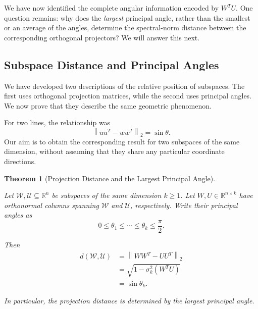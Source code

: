 \documentclass[14pt,letterpaper]{article}
\theoremstyle{plain}
\newtheorem{theorem}{Theorem}[section]
\theoremstyle{definition}
\theoremstyle{remark}
\newcommand{\R}{\mathbb{R}}
\newcommand{\norm}[1]{\left\lVert #1 \right\rVert}
\begin{document}
We have now identified the complete angular
information encoded by $W^TU$. One question remains:
why does the \emph{largest} principal angle, rather than
the smallest or an average of the angles, determine the
spectral-norm distance between the corresponding
orthogonal projectors? We will answer this next.




\subsection{Subspace Distance and Principal Angles}
\label{subsec:distance_principal_angles}

We have developed two descriptions of the relative position
of subspaces. The first uses orthogonal projection matrices,
while the second uses principal angles. We now prove that
they describe the same geometric phenomenon.

For two lines, the relationship was
\[
\norm{uu^T-ww^T}_2=\sin\theta.
\]
Our aim is to obtain the corresponding result for two
subspaces of the same dimension, without assuming that
they share any particular coordinate directions.

\begin{theorem}[Projection Distance and the Largest Principal Angle]
\label{thm:projection_distance_principal_angles}

Let $\mathcal W,\mathcal U\subseteq\R^n$ be subspaces of
the same dimension $k\geq1$. Let $W,U\in\R^{n\times k}$
have orthonormal columns spanning $\mathcal W$ and
$\mathcal U$, respectively. Write their principal angles as
\[
0\leq\theta_1\leq\cdots\leq\theta_k\leq\frac{\pi}{2}.
\]

Then
\[
\boxed{
\begin{aligned}
d(\mathcal W,\mathcal U)
&=\norm{WW^T-UU^T}_2\\[3pt]
&=\sqrt{1-\sigma_k^2(W^TU)}\\[3pt]
&=\sin\theta_k.
\end{aligned}
}
\]

In particular, the projection distance is determined by
the \emph{largest} principal angle.

\end{theorem}
\end{document}
